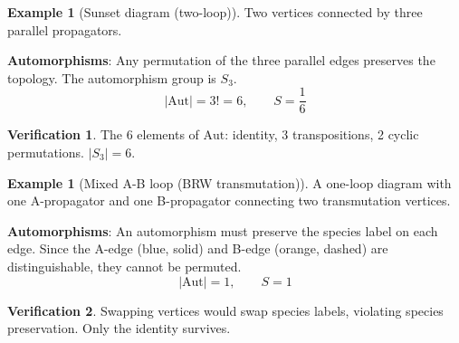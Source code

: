 \documentclass[11pt,a4paper]{article}
\theoremstyle{definition}
\newtheorem{example}[theorem]{Example}
\newtheorem*{verification}{Verification}
\newcommand{\Aut}{\mathrm{Aut}}
\begin{document}
\begin{example}[Sunset diagram (two-loop)]
\label{ex:sunset}
Two vertices connected by three parallel propagators.

\begin{center}
\end{center}

\textbf{Automorphisms}: Any permutation of the three parallel edges
preserves the topology. The automorphism group is $S_3$.
\begin{equation}
|\Aut| = 3! = 6, \qquad S = \frac{1}{6}
\end{equation}

\begin{verification}
The 6 elements of $\Aut$: identity, 3 transpositions, 2 cyclic
permutations. $|S_3| = 6$. \checkmark
\end{verification}
\end{example}

\begin{example}[Mixed A-B loop (BRW transmutation)]
\label{ex:mixed}
A one-loop diagram with one A-propagator and one B-propagator
connecting two transmutation vertices.

\begin{center}
\end{center}

\textbf{Automorphisms}: An automorphism must preserve the species label
on each edge. Since the A-edge (\textcolor{blue!70!black}{blue, solid}) and
B-edge (\textcolor{orange!80!black}{orange, dashed}) are distinguishable,
they cannot be permuted.
\begin{equation}
|\Aut| = 1, \qquad S = 1
\end{equation}

\begin{verification}
Swapping vertices would swap species labels, violating species
preservation. Only the identity survives. \checkmark
\end{verification}
\end{example}
\end{document}
